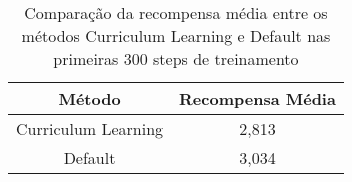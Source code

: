 \begin{table}[H]
    \centering
    \begin{tabular}{|c|c|}
        \hline
        \textbf{Método} & \textbf{Recompensa Média} \\
        \hline
        Curriculum Learning & 2,813 \\
        Default & 3,034 \\
        \hline
    \end{tabular}
    \caption{Comparação da recompensa média entre os métodos Curriculum Learning e Default nas primeiras 300 steps de treinamento}
    \label{tab:cl_vs_default}
\end{table}